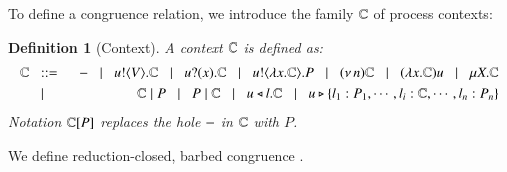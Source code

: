 \documentclass[preprint,11pt]{elsarticle}
\newtheorem{definition}{Definition}[section]
\begin{document}


To define a congruence relation, we introduce the family ${\mathbb{C}}$ of process contexts:

\begin{definition}[Context]
	A context ${\mathbb{C}}$ is defined as:
\begin{eqnarray*}
		{\mathbb{C}} & \;\;::=\;\; &  - \;\;\;|\;\;\; u ! \langle V \rangle . {\mathbb{C}} \;\;\;|\;\;\; u ? (x) . {\mathbb{C}} \;\;\;|\;\;\; u ! \langle \lambda x.{\mathbb{C}} \rangle . P \;\;\;|\;\;\; (\nu\, n) {\mathbb{C}}
		\;\;\;|\;\;\; (\lambda x.{\mathbb{C}})u \;\;\;|\;\;\; \mu X. {\mathbb{C}}  
		\\
		& \;\;\;|\;\;\; &  {\mathbb{C}} \;|\; P \;\;\;|\;\;\; P \;|\; {\mathbb{C}} \;\;\;|\;\;\; u \triangleleft l . {\mathbb{C}} \;\;\;|\;\;\; u \triangleright \{l_1:P_1,\cdots,l_i:{\mathbb{C}},\cdots,l_n:P_n\} 
	\end{eqnarray*}
Notation ${\mathbb{C}}[P]$ replaces 
the hole $-$ in ${\mathbb{C}}$ with $P$.
\end{definition}


We define reduction-closed, barbed congruence \cite{HondaKYoshida95}. 

\end{document}
